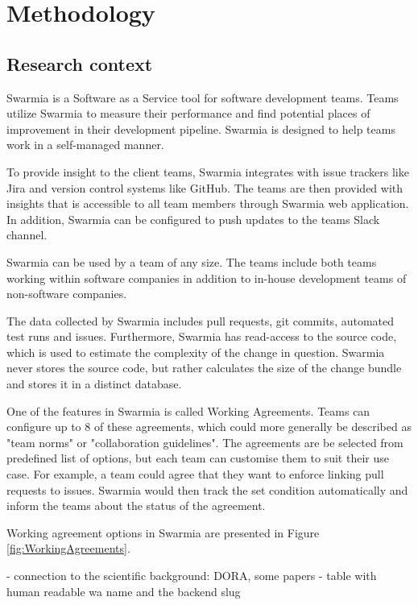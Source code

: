 
\chapter{Methodology}

\section{Research context}

Swarmia is a Software as a Service tool for software development teams. Teams utilize Swarmia to measure their performance and find potential places of improvement in their development pipeline. Swarmia is designed to help teams work in a self-managed manner. 

To provide insight to the client teams, Swarmia integrates with issue trackers like Jira and version control systems like GitHub. The teams are then provided with insights that is accessible to all team members through Swarmia web application. In addition, Swarmia can be configured to push updates to the teams Slack channel. 

Swarmia can be used by a team of any size. The teams include both teams working within software companies in addition to in-house development teams of non-software companies. 

The data collected by Swarmia includes pull requests, git commits, automated test runs and issues. Furthermore, Swarmia has read-access to the source code, which is used to estimate the complexity of the change in question. Swarmia never stores the source code, but rather calculates the size of the change bundle and stores it in a distinct database. 

One of the features in Swarmia is called Working Agreements. Teams can configure up to 8 of these agreements, which could more generally be described as "team norms" or "collaboration guidelines". The agreements are be selected from predefined list of options, but each team can customise them to suit their use case. For example, a team could agree that they want to enforce linking pull requests to issues. Swarmia would then track the set condition automatically and inform the teams about the status of the agreement. 

Working agreement options in Swarmia are presented in Figure \ref{fig:WorkingAgreements}.



- connection to the scientific background: DORA, some papers
- table with human readable wa name and the backend slug

